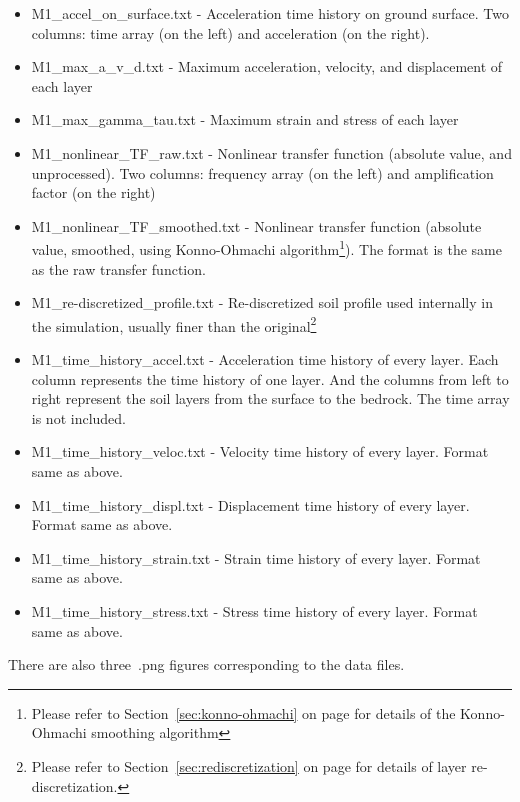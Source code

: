 \documentclass[11pt,letterpaper]{article}
\begin{document}
\begin{small}
\begin{itemize}
\item \textsf{M1\_accel\_on\_surface.txt} - Acceleration time history on ground surface. Two columns: time array (on the left) and acceleration (on the right).
\item \textsf{M1\_max\_a\_v\_d.txt} - Maximum acceleration, velocity, and displacement of each layer
\item \textsf{M1\_max\_gamma\_tau.txt} - Maximum strain and stress of each layer
\item \textsf{M1\_nonlinear\_TF\_raw.txt} - Nonlinear transfer function (absolute value, and unprocessed). Two columns: frequency array (on the left) and amplification factor (on the right)
\item \textsf{M1\_nonlinear\_TF\_smoothed.txt} - Nonlinear transfer function (absolute value, smoothed, using Konno-Ohmachi algorithm\footnote{Please refer to Section~\ref{sec:konno-ohmachi} on page \pageref{sec:konno-ohmachi} for details of the Konno-Ohmachi smoothing algorithm}). The format is the same as the raw transfer function.
\item \textsf{M1\_re-discretized\_profile.txt} - Re-discretized soil profile used internally in the simulation, usually finer than the original\footnote{Please refer to Section~\ref{sec:rediscretization} on page \pageref{sec:konno-ohmachi} for details of layer re-discretization.}
\item \textsf{M1\_time\_history\_accel.txt} - Acceleration time history of every layer. Each column represents the time history of one layer. And the columns from left to right represent the soil layers from the surface to the bedrock. The time array is not included.
\item \textsf{M1\_time\_history\_veloc.txt} - Velocity time history of every layer. Format same as above.
\item \textsf{M1\_time\_history\_displ.txt} - Displacement time history of every layer. Format same as above.
\item \textsf{M1\_time\_history\_strain.txt} - Strain time history of every layer. Format same as above.
\item \textsf{M1\_time\_history\_stress.txt} - Stress time history of every layer. Format same as above.
\end{itemize}
\end{small}

There are also three~\textsf{.png} figures corresponding to the data files.
\end{document}
